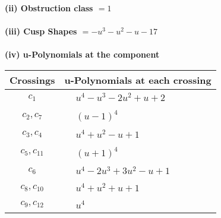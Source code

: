 \documentclass[1p]{elsarticle_modified}
\theoremstyle{definition}
\begin{document}
\flushleft \textbf{(ii) Obstruction class $= 1$}\\~\\
\flushleft \textbf{(iii) Cusp Shapes $= - u^3- u^2- u-17$}\\~\\
\newpage\renewcommand{\arraystretch}{1}
\flushleft \textbf{(iv) u-Polynomials at the component}\newline \\
\begin{tabular}{m{50pt}|m{274pt}}
Crossings & \hspace{64pt}u-Polynomials at each crossing \\
\hline $$\begin{aligned}c_{1}\end{aligned}$$&$\begin{aligned}
&u^4- u^3-2 u^2+u+2
\end{aligned}$\\
\hline $$\begin{aligned}c_{2},c_{7}\end{aligned}$$&$\begin{aligned}
&(u-1)^4
\end{aligned}$\\
\hline $$\begin{aligned}c_{3},c_{4}\end{aligned}$$&$\begin{aligned}
&u^4+u^2- u+1
\end{aligned}$\\
\hline $$\begin{aligned}c_{5},c_{11}\end{aligned}$$&$\begin{aligned}
&(u+1)^4
\end{aligned}$\\
\hline $$\begin{aligned}c_{6}\end{aligned}$$&$\begin{aligned}
&u^4-2 u^3+3 u^2- u+1
\end{aligned}$\\
\hline $$\begin{aligned}c_{8},c_{10}\end{aligned}$$&$\begin{aligned}
&u^4+u^2+u+1
\end{aligned}$\\
\hline $$\begin{aligned}c_{9},c_{12}\end{aligned}$$&$\begin{aligned}
&u^4
\end{aligned}$\\
\hline
\end{tabular}\\~\\
\end{document}
